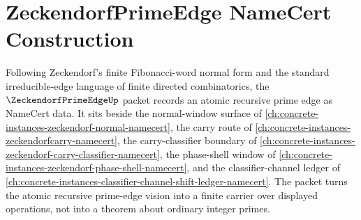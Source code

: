\chapter{ZeckendorfPrimeEdge NameCert Construction}
\label{ch:concrete-instances-zeckendorf-prime-edge-namecert}

Following Zeckendorf's finite Fibonacci-word normal form and the standard irreducible-edge language of finite directed combinatorics, the $\ZeckendorfPrimeEdgeUp$ packet records an atomic recursive prime edge as NameCert data. It sits beside the normal-window surface of \autoref{ch:concrete-instances-zeckendorf-normal-namecert}, the carry route of \autoref{ch:concrete-instances-zeckendorfcarry-namecert}, the carry-classifier boundary of \autoref{ch:concrete-instances-zeckendorf-carry-classifier-namecert}, the phase-shell window of \autoref{ch:concrete-instances-zeckendorf-phase-shell-namecert}, and the classifier-channel ledger of \autoref{ch:concrete-instances-classifier-channel-shift-ledger-namecert}. The packet turns the atomic recursive prime-edge vision into a finite carrier over displayed operations, not into a theorem about ordinary integer primes.

